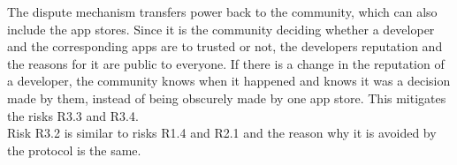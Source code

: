 The dispute mechanism transfers power back to the community, which can also include the app stores. Since it is the community deciding whether a developer and the corresponding apps are to trusted or not, the developers reputation and the reasons for it are public to everyone. If there is a change in the reputation of a developer, the community knows when it happened and knows it was a decision made by them, instead of being obscurely made by one app store. This mitigates the risks \textsf{R3.3} and \textsf{R3.4}. \\

Risk \textsf{R3.2} is similar to risks \textsf{R1.4} and \textsf{R2.1} and the reason why it is avoided by the protocol is the same.






%


